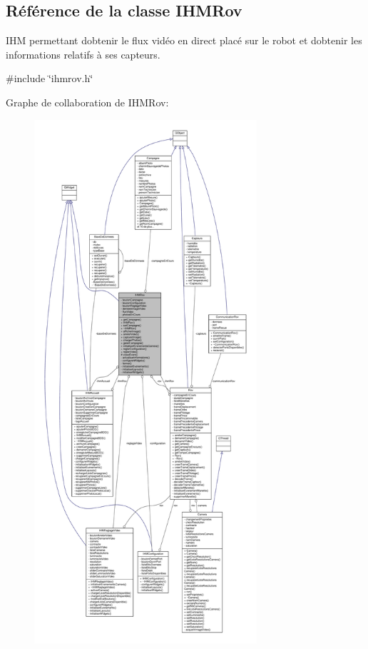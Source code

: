 \hypertarget{class_i_h_m_rov}{}\subsection{Référence de la classe I\+H\+M\+Rov}
\label{class_i_h_m_rov}


I\+HM permettant d\textquotesingle{}obtenir le flux vidéo en direct placé sur le robot et d\textquotesingle{}obtenir les informations relatifs à ses capteurs.  




{\ttfamily \#include \char`\"{}ihmrov.\+h\char`\"{}}



Graphe de collaboration de I\+H\+M\+Rov\+:
\nopagebreak
\begin{figure}[H]
\begin{center}
\leavevmode
\includegraphics[height=550pt]{class_i_h_m_rov__coll__graph}
\end{center}
\end{figure}
